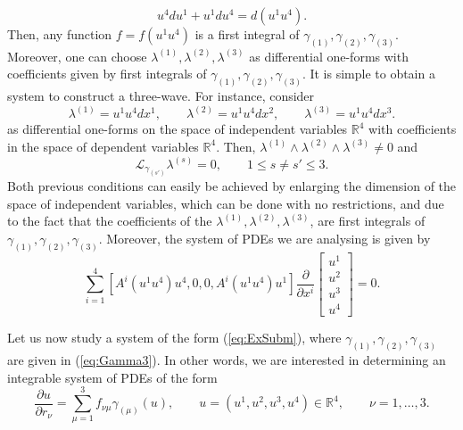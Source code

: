 \documentclass[12pt]{article}
\theoremstyle{plain}
\theoremstyle{definition}
\numberwithin{equation}{section}
\begin{document}
$$
u^4du^1+u^1du^4=d(u^1u^4).
$$
Then, any function $f=f(u^1u^4)$ is a first integral of $\gamma_{(1)},\gamma_{(2)},\gamma_{(3)}$. Moreover, one can choose $\lambda^{(1)},\lambda^{(2)},\lambda^{(3)}$ as differential one-forms with coefficients given by first integrals of $\gamma_{(1)},\gamma_{(2)},\gamma_{(3)}$. It is simple to obtain a system to construct a three-wave. For instance, consider
$$
\lambda^{(1)}=u^1u^4dx^1,\qquad \lambda^{(2)}=u^1u^4dx^2,\qquad \lambda^{(3)}=u^1u^4dx^3.
$$
as differential one-forms on the space of independent variables $\mathbb{R}^4$ with coefficients in the space of dependent variables $\mathbb{R}^4$.
Then, $\lambda^{(1)}\wedge \lambda^{(2)}\wedge \lambda^{(3)}\neq 0$ and
$$
\mathcal{L}_{\gamma_{(s')}}\lambda^{(s)}=0,\qquad 1\leq s\neq s'\leq 3.
$$
Both previous conditions can easily be achieved by enlarging the dimension of the space of independent variables, which can be done with no restrictions, and due to the fact that the coefficients of the $\lambda^{(1)},\lambda^{(2)},\lambda^{(3)}$, are first integrals of $\gamma_{(1)},\gamma_{(2)},\gamma_{(3)}$.  Moreover, the system of PDEs we are analysing is given by
$$
\sum_{i=1}^4[A^i(u^1u^4)u^4,0,0,A^i(u^1u^4)u^1]\frac{\partial}{\partial x^i}\left[\begin{array}{c}u^1\\u^2\\u^3\\u^4\end{array}\right]=0.
$$


Let us now study a system of the form (\ref{eq:ExSubm}), where $\gamma_{(1)},\gamma_{(2)},\gamma_{(3)}$ are given in (\ref{eq:Gamma3}). In other words, we are interested in determining an integrable system of PDEs of the form
\begin{equation}\label{eq:LabelEx}
\frac{\partial u}{\partial r_\nu}=\sum_{\mu=1}^3f_{\nu\mu}\gamma_{(\mu)}(u),\qquad u=(u^1,u^2,u^3,u^4)\in \mathbb{R}^4,\qquad \nu=1,\ldots,3.\end{equation}
\end{document}
